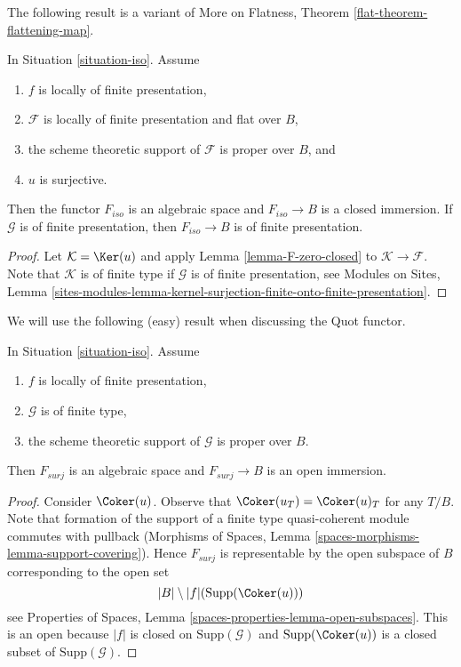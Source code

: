 \noindent
The following result is a variant of
More on Flatness, Theorem \ref{flat-theorem-flattening-map}.

\begin{lemma}
\label{lemma-F-iso-closed}
In Situation \ref{situation-iso}. Assume
\begin{enumerate}
\item $f$ is locally of finite presentation,
\item $\mathcal{F}$ is locally of finite presentation and flat over $B$,
\item the scheme theoretic support of $\mathcal{F}$ is proper over $B$, and
\item $u$ is surjective.
\end{enumerate}
Then the functor $F_{iso}$ is an algebraic space and $F_{iso} \to B$
is a closed immersion. If $\mathcal{G}$ is of finite presentation, then
$F_{iso} \to B$ is of finite presentation.
\end{lemma}

\begin{proof}
Let $\mathcal{K} = \Ker(u)$ and apply Lemma \ref{lemma-F-zero-closed}
to $\mathcal{K} \to \mathcal{F}$. Note that $\mathcal{K}$ is of finite type
if $\mathcal{G}$ is of finite presentation, see
Modules on Sites, Lemma
\ref{sites-modules-lemma-kernel-surjection-finite-onto-finite-presentation}.
\end{proof}

\noindent
We will use the following (easy) result when discussing the Quot functor.

\begin{lemma}
\label{lemma-F-surj-open}
In Situation \ref{situation-iso}. Assume
\begin{enumerate}
\item $f$ is locally of finite presentation,
\item $\mathcal{G}$ is of finite type,
\item the scheme theoretic support of $\mathcal{G}$ is proper over $B$.
\end{enumerate}
Then $F_{surj}$ is an algebraic space and $F_{surj} \to B$
is an open immersion.
\end{lemma}

\begin{proof}
Consider $\Coker(u)$. Observe that
$\Coker(u_T) = \Coker(u)_T$ for any $T/B$.
Note that formation of the support of a finite type
quasi-coherent module commutes with pullback
(Morphisms of Spaces, Lemma \ref{spaces-morphisms-lemma-support-covering}).
Hence $F_{surj}$ is representable by the open subspace of $B$
corresponding to the open set
$$
|B| \setminus |f|(\text{Supp}(\Coker(u)))
$$
see Properties of Spaces, Lemma \ref{spaces-properties-lemma-open-subspaces}.
This is an open because $|f|$ is closed on $\text{Supp}(\mathcal{G})$
and $\text{Supp}(\Coker(u))$ is a closed subset of
$\text{Supp}(\mathcal{G})$.
\end{proof}










